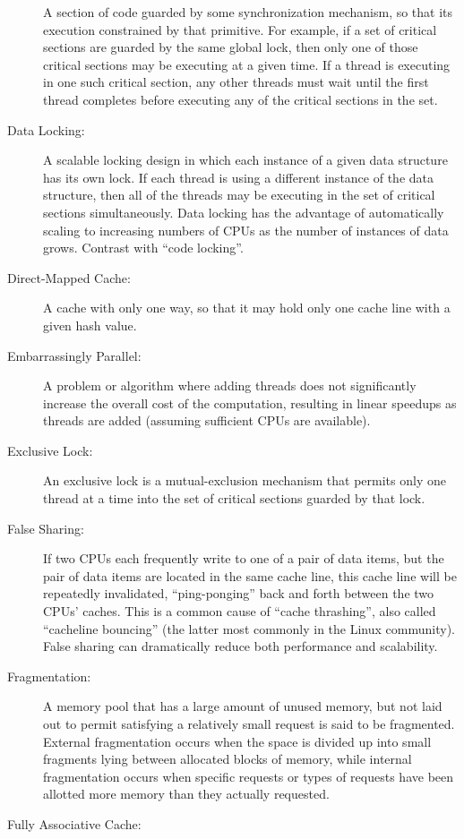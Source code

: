 \begin{description}
	A section of code guarded by some synchronization mechanism,
	so that its execution constrained by that primitive.
	For example, if a set of critical sections are guarded by
	the same global lock, then only one of those critical sections
	may be executing at a given time.
	If a thread is executing in one such critical section,
	any other threads must wait until the first thread completes
	before executing any of the critical sections in the set.
	\fi
\item[Data Locking:]
	A scalable locking design in which each instance of a given
	data structure has its own lock.
	If each thread is using a different instance of the
	data structure, then all of the threads may be executing in
	the set of critical sections simultaneously.
	Data locking has the advantage of automatically scaling to
	increasing numbers of CPUs as the number of instances of
	data grows.
	Contrast with ``code locking''.
\item[Direct-Mapped Cache:]
	A cache with only one way, so that it may hold only one cache
	line with a given hash value.
\item[Embarrassingly Parallel:]
	A problem or algorithm where adding threads does not significantly
	increase the overall cost of the computation, resulting in
	linear speedups as threads are added (assuming sufficient
	CPUs are available).
\item[Exclusive Lock:]
	An exclusive lock is a mutual-exclusion mechanism that
	permits only one thread at a time into the
	set of critical sections guarded by that lock.
\item[False Sharing:]
	If two CPUs each frequently write to one of a pair of data items,
	but the pair of data items are located in the same cache line,
	this cache line will be repeatedly invalidated, ``ping-ponging''
	back and forth between the two CPUs' caches.
	This is a common cause of ``cache thrashing'', also called
	``cacheline bouncing'' (the latter most commonly in the Linux
	community).
	False sharing can dramatically reduce both performance and
	scalability.
\item[Fragmentation:]
	A memory pool that has a large amount of unused memory, but
	not laid out to permit satisfying a relatively small request
	is said to be fragmented.
	External fragmentation occurs when the space is divided up
	into small fragments lying between allocated blocks of memory,
	while internal fragmentation occurs when specific requests or
	types of requests have been allotted more memory than they
	actually requested.
\item[Fully Associative Cache:]

\end{description}
